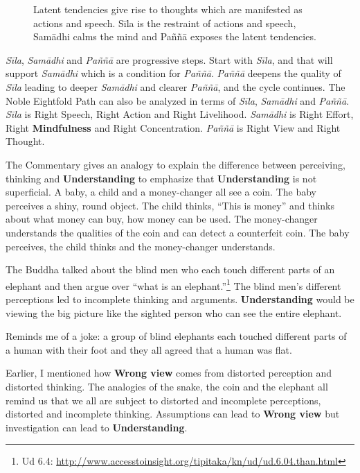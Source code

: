 \begin{figure}[H]
\centering

\caption{Latent tendencies give rise to thoughts which are manifested as actions and speech. Sīla is the restraint of actions and speech, Samādhi calms the mind and Paññā exposes the latent tendencies.}
\label{fig:Sila}
\end{figure}

\textit{Sīla}, \textit{Samādhi} and \textit{Paññā} are progressive steps. Start with \textit{Sīla}, and that will support \textit{Samādhi} which is a condition for \textit{Paññā}. \textit{Paññā} deepens the quality of \textit{Sīla} leading to deeper \textit{Samādhi} and clearer \textit{Paññā}, and the cycle continues. The Noble Eightfold Path can also be analyzed in terms of \textit{Sīla}, \textit{Samādhi} and \textit{Paññā}. \textit{Sīla} is Right Speech, Right Action and Right Livelihood. \textit{Samādhi} is Right Effort, Right \textbf{Mindfulness} and Right Concentration. \textit{Paññā} is Right View and Right Thought.

The Commentary gives an analogy to explain the difference between perceiving, thinking and \textbf{Understanding} to emphasize that \textbf{Understanding} is not superficial. A baby, a child and a money-changer all see a coin. The baby perceives a shiny, round object. The child thinks, “This is money” and thinks about what money can buy, how money can be used. The money-changer understands the qualities of the coin and can detect a counterfeit coin. The baby perceives, the child thinks and the money-changer understands.

The Buddha talked about the blind men who each touch different parts of an elephant and then argue over “what is an elephant.”\footnote{Ud 6.4: \url{http://www.accesstoinsight.org/tipitaka/kn/ud/ud.6.04.than.html}} The blind men’s different perceptions led to incomplete thinking and arguments. \textbf{Understanding} would be viewing the big picture like the sighted person who can see the entire elephant. 

Reminds me of a joke: a group of blind elephants each touched different parts of a human with their foot and they all agreed that a human was flat.

Earlier, I mentioned how \textbf{Wrong view} comes from distorted perception and distorted thinking. The analogies of the snake, the coin and the elephant all remind us that we all are subject to distorted and incomplete perceptions, distorted and incomplete thinking. Assumptions can lead to \textbf{Wrong view} but investigation can lead to \textbf{Understanding}.

